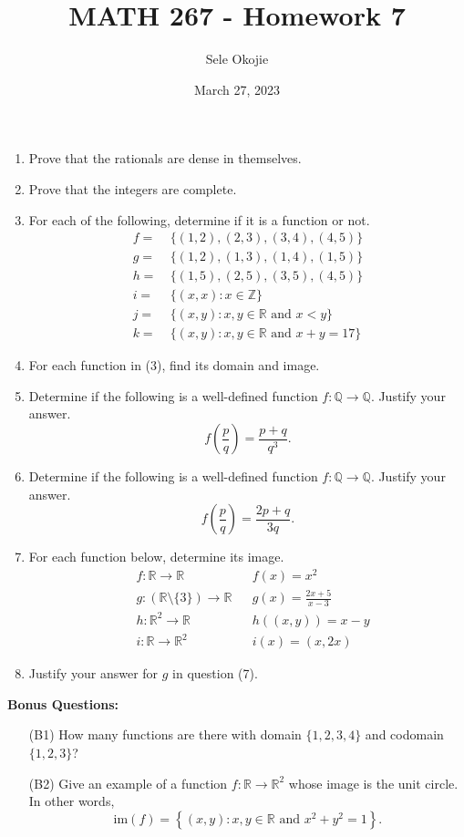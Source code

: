\documentclass{article}
\title{MATH 267 - Homework 7}
\author{Sele Okojie}
\date{March 27, 2023}
\begin{document}
    \maketitle

    \begin{enumerate}
	\item Prove that the rationals are dense in themselves.
	\item Prove that the integers are complete.
	\item For each of the following, determine if it is a function or not.
		\begin{align*}
			f = & \ \{ (1, 2), (2, 3), (3, 4), (4, 5) \} \\
			g = & \ \{ (1, 2), (1, 3), (1, 4), (1, 5) \} \\
			h = & \ \{ (1, 5), (2, 5), (3, 5), (4, 5) \} \\
			i = & \ \{ (x,x) : x \in \mathbb{Z} \} \\
			j = & \ \{ (x,y) : x, y \in \mathbb{R} \text{ and } x < y \} \\
			k = & \ \{ (x,y) : x, y \in \mathbb{R} \text{ and } x + y = 17 \}
		\end{align*}
	\item For each function in (3), find its domain and image.
	\item Determine if the following is a well-defined function $f : \mathbb{Q} \rightarrow \mathbb{Q}$.  Justify your answer.
		\[
			f \left( \frac{p}{q} \right) = \frac{ p + q }{ q^3 }.
		\]
	\item Determine if the following is a well-defined function $f : \mathbb{Q} \rightarrow \mathbb{Q}$.  Justify your answer.
		\[
			f \left( \frac{p}{q} \right) = \frac{ 2p + q }{ 3q }.
		\]
	\item For each function below, determine its image.
		\begin{align*}
			& f : \mathbb{R} \rightarrow \mathbb{R} & & f(x) = x^2 \\
			& g : (\mathbb{R} \setminus \{ 3 \}) \rightarrow \mathbb{R} & & g(x) = \frac{2x + 5}{x - 3} \\
			& h : \mathbb{R}^2 \rightarrow \mathbb{R} & & h((x,y)) = x - y \\
			& i : \mathbb{R} \rightarrow \mathbb{R}^2 & & i(x) = (x, 2x) 
		\end{align*}
	\item Justify your answer for $g$ in question (7).
    \end{enumerate}

    \newpage
    \textbf{Bonus Questions:}
    
    \begin{itemize}
    	\item [(B1)] How many functions are there with domain $\{ 1, 2, 3, 4 \}$ and codomain $\{ 1, 2, 3 \}$?
    	\item [(B2)] Give an example of a function $f : \mathbb{R} \rightarrow \mathbb{R}^2$ whose image is the unit circle.  In other words,
    		\[
    			\mathrm{im}(f) = \left\{ (x,y) : x, y \in \mathbb{R} \text{ and } x^2 + y^2 = 1 \right\}.
    		\]
    \end{itemize}
\end{document}
